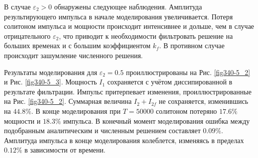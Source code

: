 \documentclass[14pt,a4paper]{extreport}
\begin{document}
			В случае \(\varepsilon_{2}>0\) обнаружены следующее наблюдения. Амплитуда результирующего импульса в начале моделирования увеличивается. Потеря солитоном импульса и мощности происходит интенсивнее и дольше, чем в случае отрицательного \(\varepsilon_{2}\), что приводит к необходимости фильтровать решение на больших временах и с большим коэффициентом \(k_{f}\). В противном случае происходит зашумление численного решения.

			Результаты моделирования для \(\varepsilon_{2}=0.5\) проиллюстрированы на Рис. \ref{fig340-5_2} и Рис. \ref{fig340-5_3}. Мощность \(I_{1}\) сохраняется с учётом диссипированной в результате фильтрации. Импульс притерпевает изменения, проиллюстрированные на Рис. \ref{fig340-5_2}. Суммарная величина \(I_{2}+I_{2f}\) не сохраняется, изменившись на \(44.8\%\). В конце моделирования при \(T=50000\) солитоном потеряно \(17.6\%\) мощности и \(18.3\%\) импульса. В конечный момент моделирования ошибка между подобранным аналитическим и численным решением составляет \(0.09\%\). Амплитуда импульса в конце моделирования колеблется, изменяясь в пределах \(0.12\%\) в зависимости от времени.
\end{document}
